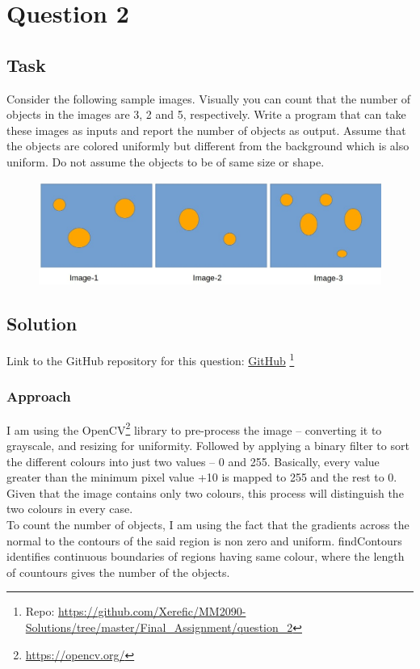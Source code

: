 \section{Question 2}

\subsection{Task}
Consider the following sample images. Visually you can count that the number of objects in the images are 3, 2 and 5, respectively. Write a program that can take these images as inputs and report the number of objects as output. Assume that the objects are colored uniformly but different from the background which is also uniform. Do not assume the objects to be of same size or shape.
\begin{figure}[!ht]
\begin{center}
	\includegraphics[width=0.75\paperwidth]{question_2/question2.eps} 
\end{center}
\end{figure} 


\subsection{Solution}

Link to the GitHub repository for this question: \href{https://github.com/Xerefic/MM2090-Solutions/tree/master/Final_Assignment/question_2}{GitHub} \footnote{Repo: \url{https://github.com/Xerefic/MM2090-Solutions/tree/master/Final_Assignment/question_2}}

\subsubsection{Approach}
I am using the OpenCV\footnote{\url{https://opencv.org/}} library to pre-process the image – converting it to grayscale, and resizing for uniformity. Followed by applying a binary filter to sort the different colours into just two values – 0 and 255. Basically, every value greater than the minimum pixel value +10 is mapped to 255 and the rest to 0. Given that the image contains only two colours, this process will distinguish the two colours in every case. \\
To count the number of objects, I am using the fact that the gradients across the normal to the contours of the said region is non zero and uniform. findContours identifies continuous boundaries of regions having same colour, where the length of countours gives the number of the objects.


